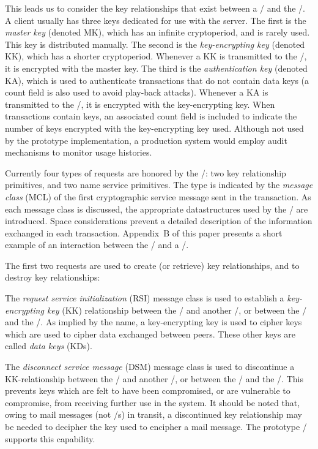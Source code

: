 This leads us to consider the key relationships that exist
between a \TMA/ and the \KDS/.
A client usually has three keys dedicated for use with the server.
The first is the {\it master key} (denoted MK),
which has an infinite cryptoperiod, and is rarely used.
This key is distributed manually.
The second is the {\it key-encrypting key} (denoted KK),
which has a shorter cryptoperiod.
Whenever a KK is transmitted to the \TMA/,
it is encrypted with the master key.
The third is the {\it authentication key} (denoted KA),
which is used to authenticate transactions that do not contain data keys
(a count field is also used to avoid play-back attacks).
Whenever a KA is transmitted to the \TMA/,
it is encrypted with the key-encrypting key.
When transactions contain keys,
an associated count field is included to indicate the number of
keys encrypted with the key-encrypting key used.
Although not used by the prototype implementation,
a production system would employ audit mechanisms to monitor usage histories.

Currently four types of requests are honored by the \KDS/:
two key relationship primitives, and two name service primitives.
The type is indicated by the {\it message class} (MCL) of the first
cryptographic service message sent in the transaction.
As each message class  is discussed,
the appropriate datastructures used by the \KDS/ are introduced.
Space considerations prevent a detailed description of the information
exchanged in each transaction.
Appendix~B of this paper presents a short example of an interaction between
the \KDS/ and a \TMA/.

The first two requests are used to create (or retrieve) key relationships,
and to destroy key relationships:

The {\it request service initialization} (RSI) message class
is used to establish a {\it key-encrypting key} (KK) relationship
between the \TMA/ and another \TMA/,
or between the \TMA/ and the \KDS/.
As implied by the name,
a key-encrypting key is used to cipher keys which are used to cipher data
exchanged between peers.
These other keys are called {\it data keys} (KDs).

The {\it disconnect service message} (DSM) message class
is used to discontinue a KK-relationship
between the \TMA/ and another \TMA/,
or between the \TMA/ and the \KDS/.
This prevents keys which are felt to have been compromised,
or are vulnerable to compromise,
from receiving further use in the system.
It should be noted that,
owing to mail messages (not \CSM/s) in transit,
a discontinued key relationship
may be needed to decipher the key used to encipher a mail message.
The prototype \KDS/ supports this capability.

